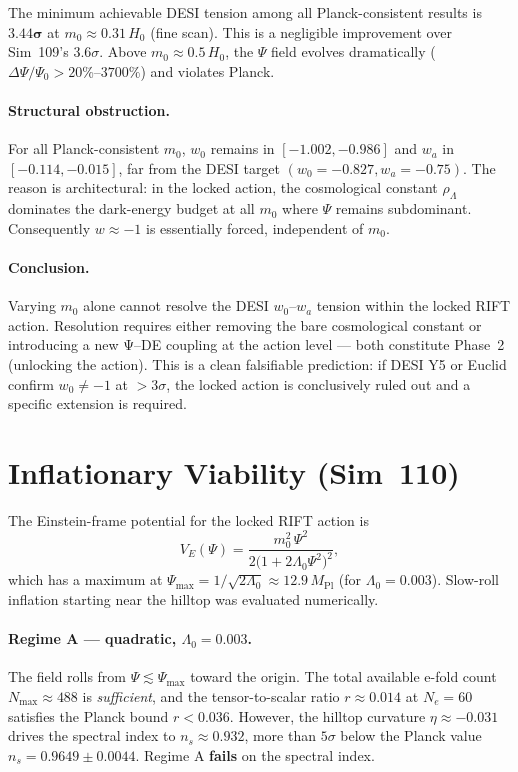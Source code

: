 \documentclass[12pt,a4paper]{article}
\begin{document}
The minimum achievable DESI tension among all Planck-consistent results
is $\mathbf{3.44\sigma}$ at $m_0\approx0.31\,H_0$ (fine scan).  This is
a negligible improvement over Sim~109's 3.6$\sigma$.
Above $m_0\approx0.5\,H_0$, the $\Psi$ field evolves dramatically
($\Delta\Psi/\Psi_0>20\%$--$3700\%$) and violates Planck.

\paragraph{Structural obstruction.}
For all Planck-consistent $m_0$, $w_0$ remains in $[-1.002,-0.986]$
and $w_a$ in $[-0.114, -0.015]$, far from the DESI target
$(w_0=-0.827, w_a=-0.75)$.  The reason is architectural: in the locked
action, the cosmological constant $\rho_\Lambda$ dominates the dark-energy
budget at all $m_0$ where $\Psi$ remains subdominant.
Consequently $w\approx-1$ is essentially forced, independent of $m_0$.

\paragraph{Conclusion.}
Varying $m_0$ alone cannot resolve the DESI $w_0$--$w_a$ tension within
the locked RIFT action.  Resolution requires either removing the bare
cosmological constant or introducing a new Ψ--DE coupling at the action
level --- both constitute Phase~2 (unlocking the action).
This is a clean falsifiable prediction: if DESI Y5 or Euclid confirm
$w_0\neq-1$ at $>3\sigma$, the locked action is conclusively ruled out
and a specific extension is required.

\section{Inflationary Viability (Sim~110)}
\label{sec:sim110}

The Einstein-frame potential for the locked RIFT action is
\begin{equation}
V_E(\Psi) = \frac{m_0^2\,\Psi^2}{2\bigl(1+2\Lambda_0\Psi^2\bigr)^2},
\end{equation}
which has a maximum at $\Psi_\mathrm{max}=1/\sqrt{2\Lambda_0}\approx12.9\,M_\mathrm{Pl}$
(for $\Lambda_0=0.003$). Slow-roll inflation starting near the hilltop was evaluated
numerically.

\paragraph{Regime A — quadratic, $\Lambda_0=0.003$.}
The field rolls from $\Psi\lesssim\Psi_\mathrm{max}$ toward the origin.
The total available e-fold count $N_\mathrm{max}\approx488$ is
\emph{sufficient}, and the tensor-to-scalar ratio $r\approx0.014$ at $N_e=60$
satisfies the Planck bound $r<0.036$.  However, the hilltop curvature
$\eta\approx-0.031$ drives the spectral index to $n_s\approx0.932$,
more than $5\sigma$ below the Planck value $n_s=0.9649\pm0.0044$.
Regime A \textbf{fails} on the spectral index.
\end{document}
